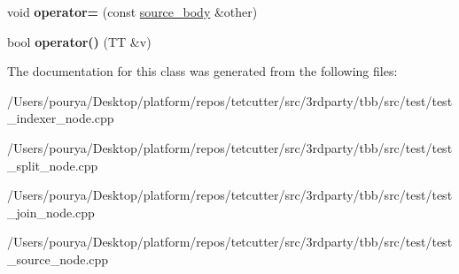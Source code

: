 \begin{DoxyCompactItemize}
\item 
\hypertarget{classsource__body_a7685a0e5bfb13ad50d2287fe09fc9ddf}{}void {\bfseries operator=} (const \hyperlink{classsource__body}{source\+\_\+body} \&other)\label{classsource__body_a7685a0e5bfb13ad50d2287fe09fc9ddf}

\item 
\hypertarget{classsource__body_a0e52d4dc191ec6a638624f99f0c86c16}{}bool {\bfseries operator()} (T\+T \&v)\label{classsource__body_a0e52d4dc191ec6a638624f99f0c86c16}

\end{DoxyCompactItemize}


The documentation for this class was generated from the following files\+:\begin{DoxyCompactItemize}
\item 
/\+Users/pourya/\+Desktop/platform/repos/tetcutter/src/3rdparty/tbb/src/test/test\+\_\+indexer\+\_\+node.\+cpp\item 
/\+Users/pourya/\+Desktop/platform/repos/tetcutter/src/3rdparty/tbb/src/test/test\+\_\+split\+\_\+node.\+cpp\item 
/\+Users/pourya/\+Desktop/platform/repos/tetcutter/src/3rdparty/tbb/src/test/test\+\_\+join\+\_\+node.\+cpp\item 
/\+Users/pourya/\+Desktop/platform/repos/tetcutter/src/3rdparty/tbb/src/test/test\+\_\+source\+\_\+node.\+cpp\end{DoxyCompactItemize}
